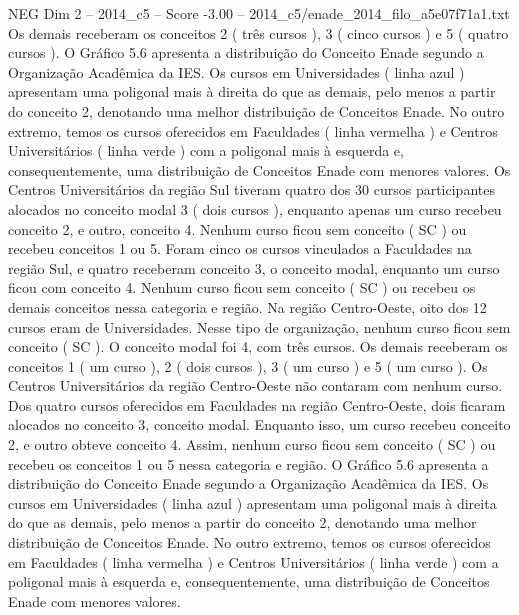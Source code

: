 \begin{textsample}{NEG Dim 2 – 2014\_c5 – Score -3.00 – 2014\_c5/enade\_2014\_filo\_a5e07f71a1.txt}
Os demais receberam os conceitos 2 ( três cursos ), 3 ( cinco cursos ) e 5 ( quatro cursos ).
O Gráfico 5.6 apresenta a distribuição do Conceito Enade segundo a Organização Acadêmica da IES.
Os cursos em Universidades ( linha azul ) apresentam uma poligonal mais à direita do que as demais, pelo menos a partir do conceito 2, denotando uma melhor distribuição de Conceitos Enade.
No outro extremo, temos os cursos oferecidos em Faculdades ( linha vermelha ) e Centros Universitários ( linha verde ) com a poligonal mais à esquerda e, consequentemente, uma distribuição de Conceitos Enade com menores valores.
Os Centros Universitários da região Sul tiveram quatro dos 30 cursos participantes alocados no conceito modal 3 ( dois cursos ), enquanto apenas um curso recebeu conceito 2, e outro, conceito 4.
Nenhum curso ficou sem conceito ( SC ) ou recebeu conceitos 1 ou 5.
Foram cinco os cursos vinculados a Faculdades na região Sul, e quatro receberam conceito 3, o conceito modal, enquanto um curso ficou com conceito 4.
Nenhum curso ficou sem conceito ( SC ) ou recebeu os demais conceitos nessa categoria e região.
Na região Centro-Oeste, oito dos 12 cursos eram de Universidades.
Nesse tipo de organização, nenhum curso ficou sem conceito ( SC ).
O conceito modal foi 4, com três cursos.
Os demais receberam os conceitos 1 ( um curso ), 2 ( dois cursos ), 3 ( um curso ) e 5 ( um curso ).
Os Centros Universitários da região Centro-Oeste não contaram com nenhum curso.
Dos quatro cursos oferecidos em Faculdades na região Centro-Oeste, dois ficaram alocados no conceito 3, conceito modal.
Enquanto isso, um curso recebeu conceito 2, e outro obteve conceito 4.
Assim, nenhum curso ficou sem conceito ( SC ) ou recebeu os conceitos 1 ou 5 nessa categoria e região.
O Gráfico 5.6 apresenta a distribuição do Conceito Enade segundo a Organização Acadêmica da IES.
Os cursos em Universidades ( linha azul ) apresentam uma poligonal mais à direita do que as demais, pelo menos a partir do conceito 2, denotando uma melhor distribuição de Conceitos Enade.
No outro extremo, temos os cursos oferecidos em Faculdades ( linha vermelha ) e Centros Universitários ( linha verde ) com a poligonal mais à esquerda e, consequentemente, uma distribuição de Conceitos Enade com menores valores.

\end{textsample}
